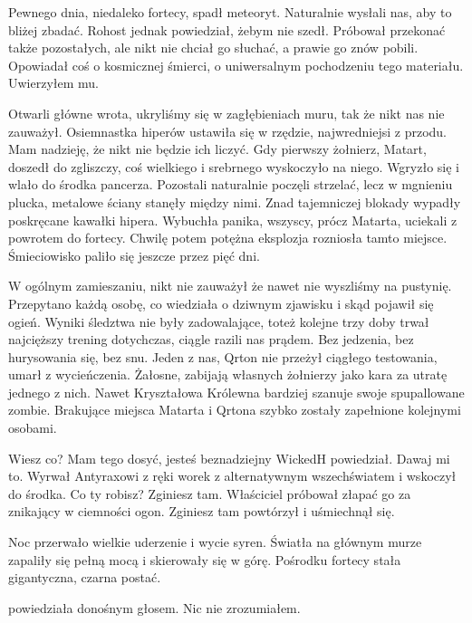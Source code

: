 Pewnego dnia, niedaleko fortecy, spadł meteoryt.
Naturalnie wysłali nas, aby to bliżej zbadać.
Rohost jednak powiedział, żebym nie szedł. 
Próbował przekonać także pozostałych, ale nikt nie chciał go słuchać, a prawie go znów pobili.
Opowiadał coś o kosmicznej śmierci, o uniwersalnym pochodzeniu tego materiału.
Uwierzyłem mu.

Otwarli główne wrota, ukryliśmy się w zagłębieniach muru, tak że nikt nas nie zauważył.
Osiemnastka hiperów ustawiła się w rzędzie, najwredniejsi z przodu.
Mam nadzieję, że nikt nie będzie ich liczyć.
Gdy pierwszy żołnierz, Matart, doszedł do zgliszczy, coś wielkiego i srebrnego wyskoczyło na niego.
Wgryzło się i wlało do środka pancerza.
Pozostali naturalnie poczęli strzelać, lecz w mgnieniu plucka, metalowe ściany stanęły między nimi.
Znad tajemniczej blokady wypadły poskręcane kawałki hipera.
Wybuchła panika, wszyscy, prócz Matarta, uciekali z powrotem do fortecy.
Chwilę potem potężna eksplozja rozniosła tamto miejsce.
Śmieciowisko paliło się jeszcze przez pięć dni.

W ogólnym zamieszaniu, nikt nie zauważył że nawet nie wyszliśmy na pustynię.
Przepytano każdą osobę, co wiedziała o dziwnym zjawisku i skąd pojawił się ogień.
Wyniki śledztwa nie były zadowalające, toteż kolejne trzy doby trwał najcięższy trening dotychczas, ciągle razili nas prądem.
Bez jedzenia, bez hurysowania się, bez snu. Jeden z nas, Qrton nie przeżył ciągłego testowania, umarł z wycieńczenia. 
Żałosne, zabijają własnych żołnierzy jako kara za utratę jednego z nich. Nawet Kryształowa Królewna bardziej szanuje swoje spupallowane zombie.
Brakujące miejsca Matarta i Qrtona szybko zostały zapełnione kolejnymi osobami.

\divider{}

\begin{dialogue}
\ds{} Wiesz co? Mam tego dosyć, jesteś beznadziejny \dm{} WickedH powiedział. \dm{} Dawaj mi to. \dm{} Wyrwał Antyraxowi z ręki worek z alternatywnym wszechświatem i wskoczył do środka.
\ds{} Co ty robisz? Zginiesz tam. \dm{} Właściciel próbował złapać go za znikający w ciemności ogon. \dm{} Zginiesz tam \dm{} powtórzył i uśmiechnął się.
\end{dialogue}

\divider{}

Noc przerwało wielkie uderzenie i wycie syren.
Światła na głównym murze zapaliły się pełną mocą i skierowały się w górę.
Pośrodku fortecy stała gigantyczna, czarna postać.

\begin{dialogue}
\ds{}  \dm{} powiedziała donośnym głosem. Nic nie zrozumiałem.
\end{dialogue}

